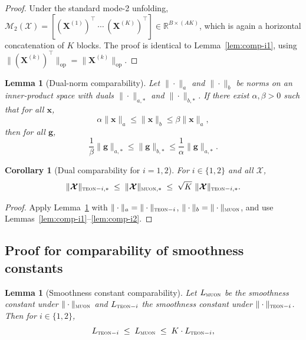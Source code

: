 \documentclass{article}
\newcommand{\ten}[1]{\bm{\mathcal{#1}}}
\newcommand{\mat}[1]{\mathbf{#1}}
\theoremstyle{plain}
\newtheorem{lemma}[theorem]{Lemma}
\newtheorem{corollary}[theorem]{Corollary}
\theoremstyle{definition}
\theoremstyle{remark}
\begin{document}
\begin{proof}
Under the standard mode-2 unfolding,
$\mathcal{M}_2(\ten{X})=[(\mat{X}^{(1)})^\top~\cdots~(\mat{X}^{(K)})^\top]\in\mathbb{R}^{B\times (AK)}$,
which is again a horizontal concatenation of $K$ blocks. The proof is identical to
Lemma~\ref{lem:comp-i1}, using $\|(\mat{X}^{(k)})^\top\|_{\mathrm{op}}=\|\mat{X}^{(k)}\|_{\mathrm{op}}$.
\end{proof}

\begin{lemma}[Dual-norm comparability]
\label{lem:dual-comparability}
Let $\|\cdot\|_a$ and $\|\cdot\|_b$ be norms on an inner-product space with duals
$\|\cdot\|_{a,*}$ and $\|\cdot\|_{b,*}$.
If there exist $\alpha,\beta>0$ such that for all $\mat{x}$,
\[
\alpha \|\mat{x}\|_a \le \|\mat{x}\|_b \le \beta \|\mat{x}\|_a,
\]
then for all $\mat{g}$,
\[
\frac{1}{\beta}\|\mat{g}\|_{a,*} \le \|\mat{g}\|_{b,*} \le \frac{1}{\alpha}\|\mat{g}\|_{a,*}.
\]
\end{lemma}

\begin{corollary}[Dual comparability for $i=1,2$]
\label{cor:dual-i12}
For $i\in\{1,2\}$ and all $\ten{X}$,
\begin{equation}
\label{eq:dual-comp-i12}
\|\ten{X}\|_{\textsc{teon}-i,*}
\;\le\;
\|\ten{X}\|_{\textsc{muon},*}
\;\le\;
\sqrt{K}\ \|\ten{X}\|_{\textsc{teon}-i,*}.
\end{equation}
\end{corollary}

\begin{proof}
Apply Lemma~\ref{lem:dual-comparability} with
$\|\cdot\|_a=\|\cdot\|_{\textsc{teon}-i}$,
$\|\cdot\|_b=\|\cdot\|_{\textsc{muon}}$,
and use Lemmas~\ref{lem:comp-i1}--\ref{lem:comp-i2}.
\end{proof}

\subsection{Proof for comparability of smoothness constants }
\label{app:smoothness-comparability}

\begin{lemma}[Smoothness constant comparability]
\label{lem:smooth-constants}
Let $L_{\textsc{muon}}$ be the smoothness constant under $\|\cdot\|_{\textsc{muon}}$ and
$L_{\textsc{teon}-i}$ the smoothness constant under $\|\cdot\|_{\textsc{teon}-i}$.
Then for $i\in\{1,2\}$,
\begin{equation}
\label{eq:smooth-i12}
L_{\textsc{teon}-i}
\;\le\;
L_{\textsc{muon}}
\;\le\;
K\cdot L_{\textsc{teon}-i},
\end{equation}
\end{lemma}
\end{document}
